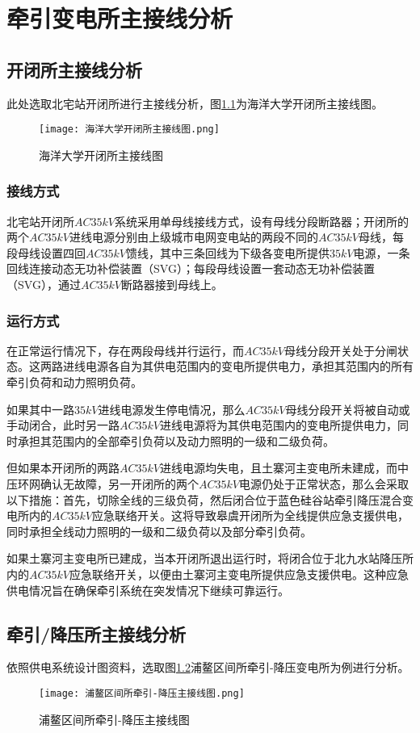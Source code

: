 \chapter{牵引变电所主接线分析}
\section{开闭所主接线分析}
此处选取北宅站开闭所进行主接线分析，图\ref{海洋大学开闭所主接线图}为海洋大学开闭所主接线图。
\begin{figure}[h]
	\centering
	\texttt{[image: 海洋大学开闭所主接线图.png]}
	\caption{海洋大学开闭所主接线图}
	\label{海洋大学开闭所主接线图}
\end{figure}
\subsection{接线方式}
北宅站开闭所$AC35kV$系统采用单母线接线方式，设有母线分段断路器；开闭所的两个$AC35kV$进线电源分别由上级城市电网变电站的两段不同的$AC35kV$母线，每段母线设置四回$AC35kV$馈线，其中三条回线为下级各变电所提供$35kV$电源，一条回线连接动态无功补偿装置（SVG）；每段母线设置一套动态无功补偿装置（SVG），通过$AC35kV$断路器接到母线上。
\subsection{运行方式}
在正常运行情况下，存在两段母线并行运行，而$AC35kV$母线分段开关处于分闸状态。这两路进线电源各自为其供电范围内的变电所提供电力，承担其范围内的所有牵引负荷和动力照明负荷。


如果其中一路$35kV$进线电源发生停电情况，那么$AC35kV$母线分段开关将被自动或手动闭合，此时另一路$AC35kV$进线电源将为其供电范围内的变电所提供电力，同时承担其范围内的全部牵引负荷以及动力照明的一级和二级负荷。


但如果本开闭所的两路$AC35kV$进线电源均失电，且土寨河主变电所未建成，而中压环网确认无故障，另一开闭所的两个$AC35kV$电源仍处于正常状态，那么会采取以下措施：首先，切除全线的三级负荷，然后闭合位于蓝色硅谷站牵引降压混合变电所内的$AC35kV$应急联络开关。这将导致皋虞开闭所为全线提供应急支援供电，同时承担全线动力照明的一级和二级负荷以及部分牵引负荷。


如果土寨河主变电所已建成，当本开闭所退出运行时，将闭合位于北九水站降压所内的$AC35kV$应急联络开关，以便由土寨河主变电所提供应急支援供电。这种应急供电情况旨在确保牵引系统在突发情况下继续可靠运行。

\section{牵引/降压所主接线分析}
依照供电系统设计图资料，选取图\ref{浦鳌区间所牵引-降压主接线图}浦鳌区间所牵引-降压变电所为例进行分析。
\begin{figure}[h]
	\centering
	\texttt{[image: 浦鳌区间所牵引-降压主接线图.png]}
	\caption{浦鳌区间所牵引-降压主接线图}
	\label{浦鳌区间所牵引-降压主接线图}
\end{figure}
